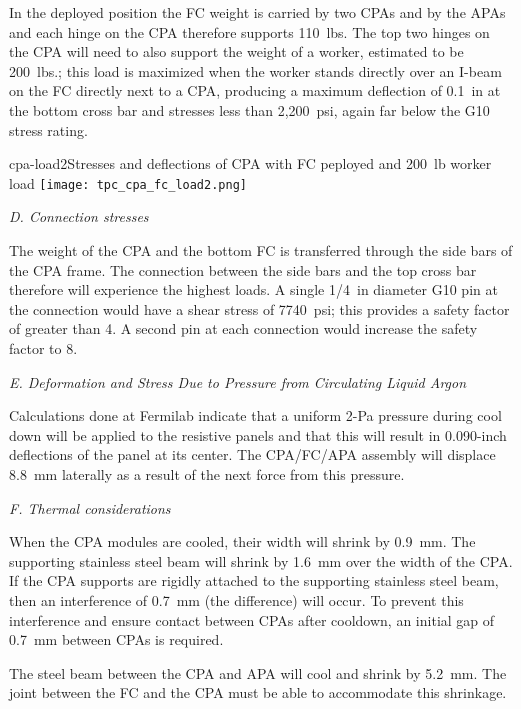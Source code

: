 In the deployed position the FC weight  is carried by two CPAs and by the APAs and each hinge on the CPA therefore supports 110~lbs.   The top two hinges on the CPA will need to also support the weight of a worker, estimated to be 200~lbs.; this load is maximized when the worker stands directly over an I-beam on the FC directly next to a CPA, producing a maximum deflection of 0.1~in at the bottom cross bar and stresses less than 2,200~psi, again far below the G10 stress rating.

\begin{cdrfigure}{cpa-load2}{Stresses and deflections of CPA with FC peployed and 200~lb worker load} 
\texttt{[image: tpc\_cpa\_fc\_load2.png]}
\end{cdrfigure}

{\it D. Connection stresses}

The weight of the CPA and the bottom FC is transferred through the side bars of the CPA frame.  The connection between the side bars and the top cross bar therefore will experience the highest loads.  A single 1/4~in diameter G10 pin at the connection would have a shear stress of 7740~psi; this provides a safety factor of greater than 4.  A second pin at each connection would increase the safety factor to 8.  

{\it E. Deformation and Stress Due to Pressure from Circulating Liquid Argon}

Calculations done at Fermilab indicate that a uniform 2-Pa pressure during cool down will be applied to the resistive panels  %
and that this will result in 0.090-inch deflections of the panel at its center.  The CPA/FC/APA assembly will displace 8.8~mm laterally as a result of the next force from this pressure.  

{\it F. Thermal considerations}

When the CPA modules are cooled, their width will shrink by 0.9~mm.  The supporting stainless steel beam will shrink by 1.6~mm over the width of the CPA.  If the CPA supports are rigidly attached to the supporting stainless steel beam, then an interference of 0.7~mm (the difference) will occur.  To prevent this interference and ensure contact between CPAs after cooldown, an initial gap of 0.7~mm between CPAs is required.  

The steel beam between the CPA and APA will cool and shrink by 5.2~mm.  The joint between the FC and the CPA must be able to accommodate this shrinkage.



